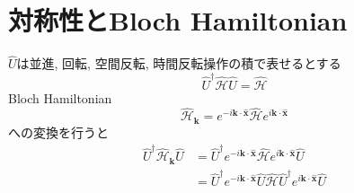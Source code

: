 \section{対称性とBloch Hamiltonian}

\begin{theotcolorbox}[title = 対称操作$\hat{U}$に関して対称なときのBloch Hamiltonian]
    $\hat{U}$は並進, 回転, 空間反転, 時間反転操作の積で表せるとする
    \begin{equation*}
        \hat{U}^{\dagger} \hat{\mathcal{H}} \hat{U} = \hat{\mathcal{H}}
    \end{equation*}
    Bloch Hamiltonian
    \begin{equation*}
        \hat{\mathcal{H}}_{\bm{k}} = e^{-i\bm{k}\cdot \hat{\bm{x}}} \hat{\mathcal{H}} e^{i\bm{k}\cdot \hat{\bm{x}}}
    \end{equation*}
    への変換を行うと
    \begin{align*}
        \hat{U}^{\dagger} \hat{\mathcal{H}}_{\bm{k}} \hat{U} & = \hat{U}^{\dagger} e^{-i\bm{k}\cdot \hat{\bm{x}}} \hat{\mathcal{H}} e^{i\bm{k}\cdot \hat{\bm{x}}} \hat{U}\\
        & = \hat{U}^{\dagger} e^{-i\bm{k}\cdot \hat{\bm{x}}} \hat{U} \hat{\mathcal{H}} \hat{U}^{\dagger} e^{i\bm{k}\cdot \hat{\bm{x}}} \hat{U}
    \end{align*}
\end{theotcolorbox}

